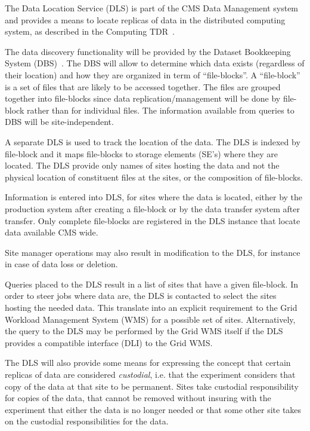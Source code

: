\documentclass[pdftex]{cmspaper}
\begin{document}
The Data Location Service (DLS) is part of the CMS Data Management system
and provides a means to locate replicas of data in the distributed computing
system, as described in the Computing TDR~\cite{CTDR}.

The data discovery functionality will be provided by the 
Dataset Bookkeeping System (DBS)~\cite{DBS}.
The DBS will allow to determine which data exists (regardless
of their location) and how they are organized in 
term of ``file-blocks''.
A ``file-block'' is a set of files that are likely to be 
accessed together. The files are grouped together into file-blocks 
since data replication/management will be done by file-block rather than 
for individual files.
The information available from queries to DBS will be site-independent.

A separate DLS is used to track the location of the data.
The DLS is indexed by file-block and it maps file-blocks
to storage elements (SE's) where they are located.
The DLS provide only names of sites hosting the data and not the
physical location of constituent files at the sites, or the composition
of file-blocks.

Information is entered into DLS, for sites where the data is located, 
either by the production system after creating a file-block or by 
the data transfer system after transfer. Only complete file-blocks 
are registered in the DLS instance that locate data available CMS wide.

Site manager operations may also result in modification to
the DLS, for instance in case of data loss or deletion.

Queries placed to the DLS result in a list of sites that have
a given file-block. 
In order to steer jobs where data are, the DLS is contacted to 
select the sites hosting the needed data.
This translate into an explicit requirement to the Grid Workload 
Management System (WMS) for a possible set of sites. Alternatively, 
the query to the DLS may be performed by the Grid WMS itself if 
the DLS provides a compatible interface (DLI) to the Grid WMS. 


  The DLS will also provide some means for expressing the concept that
certain replicas of data are considered {\em custodial}, i.e. that the
experiment considers that copy of the data at that site to be permanent.
Sites take custodial responsibility for copies of the data, that cannot 
be removed without insuring with the experiment that either the data 
is no longer needed or that some other site takes on the custodial 
responsibilities for the data.
\end{document}
